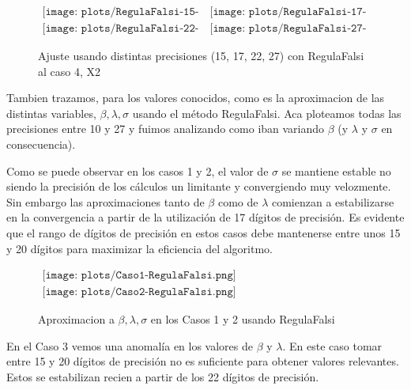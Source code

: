 \begin{figure} [H]
$\begin{array}{cc}
\texttt{[image: plots/RegulaFalsi-15-caso4.png]} &
\texttt{[image: plots/RegulaFalsi-17-caso4.png]} \\
\texttt{[image: plots/RegulaFalsi-22-caso4.png]} &
\texttt{[image: plots/RegulaFalsi-27-caso4.png]}
\end{array}$
\caption{Ajuste usando distintas precisiones (15, 17, 22, 27) con RegulaFalsi al caso 4, X2}
\label{fig:FitCaso4Newton}
\end{figure}


Tambien trazamos, para los valores conocidos, como es la aproximacion de las distintas variables, $\beta, \lambda, \sigma$ usando el m\'etodo RegulaFalsi.
Aca ploteamos todas las precisiones entre 10 y 27 y fuimos analizando como iban variando $\beta$ (y $\lambda$ y $\sigma$ en consecuencia).

Como se puede observar en los casos 1 y 2, el valor de $\sigma$ se mantiene estable no siendo la 
precisi\'on de los c\'alculos un limitante y convergiendo muy velozmente. 
Sin embargo las aproximaciones tanto de $\beta$ como de $\lambda$ comienzan a estabilizarse en la convergencia 
a partir de la utilizaci\'on de 17 d\'igitos de precisi\'on. Es evidente que el rango de d\'igitos de precisi\'on en 
estos casos debe mantenerse entre unos 15 y 20 d\'igitos para maximizar la eficiencia del algoritmo.  

\begin{figure}
$\begin{array}{c}
\texttt{[image: plots/Caso1-RegulaFalsi.png]} \\
\texttt{[image: plots/Caso2-RegulaFalsi.png]}
\end{array}$

\caption{Aproximacion a $\beta, \lambda, \sigma$ en los Casos 1 y 2 usando RegulaFalsi}
\end{figure}

En el Caso 3 vemos una anomal\'ia en los valores de $\beta$ y $\lambda$. En este caso tomar entre 15 y 20 d\'igitos de precisi\'on
no es suficiente para obtener valores relevantes. Estos se estabilizan recien a partir de los 22 d\'igitos de precisi\'on.




